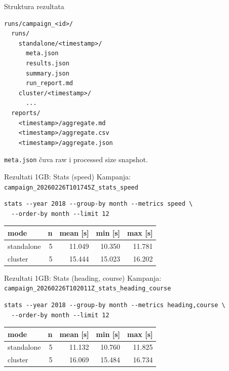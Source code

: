 \documentclass[aspectratio=169,11pt]{beamer}
\newcommand{\code}[1]{\texttt{\small #1}}
\begin{document}
\begin{frame}[fragile]{Struktura rezultata}
  \scriptsize
  \begin{verbatim}
runs/campaign_<id>/
  runs/
    standalone/<timestamp>/
      meta.json
      results.json
      summary.json
      run_report.md
    cluster/<timestamp>/
      ...
  reports/
    <timestamp>/aggregate.md
    <timestamp>/aggregate.csv
    <timestamp>/aggregate.json
  \end{verbatim}
  \normalsize

  \code{meta.json} čuva raw i processed size snapshot.
\end{frame}

\begin{frame}[fragile]{Rezultati 1GB: Stats (speed)}
  Kampanja: \code{campaign\_20260226T101745Z\_stats\_speed}

  \scriptsize
  \begin{verbatim}
stats --year 2018 --group-by month --metrics speed \
  --order-by month --limit 12
  \end{verbatim}
  \normalsize

  \begin{tabular}{lrrrr}
    \toprule
    mode & n & mean [s] & min [s] & max [s] \\
    \midrule
    standalone & 5 & 11.049 & 10.350 & 11.781 \\
    cluster & 5 & 15.444 & 15.023 & 16.202 \\
    \bottomrule
  \end{tabular}
\end{frame}

\begin{frame}[fragile]{Rezultati 1GB: Stats (heading, course)}
  Kampanja: \code{campaign\_20260226T102011Z\_stats\_heading\_course}

  \scriptsize
  \begin{verbatim}
stats --year 2018 --group-by month --metrics heading,course \
  --order-by month --limit 12
  \end{verbatim}
  \normalsize

  \begin{tabular}{lrrrr}
    \toprule
    mode & n & mean [s] & min [s] & max [s] \\
    \midrule
    standalone & 5 & 11.132 & 10.760 & 11.825 \\
    cluster & 5 & 16.069 & 15.484 & 16.734 \\
    \bottomrule
  \end{tabular}

\end{frame}
\end{document}
